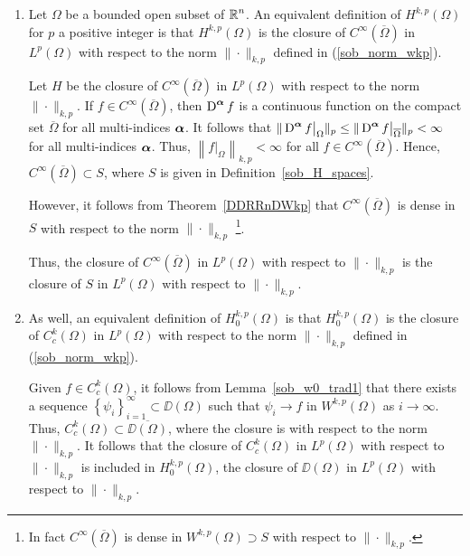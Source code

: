 \begin{rmkList} \label{sob_compl_Hk2}
\begin{enumerate}
\item Let $\Omega$ be a bounded open subset of $\displaystyle \mathbb{R}^n$.
An equivalent definition of $\displaystyle H^{k,p}(\Omega)$ for $p$ a
positive integer is that $\displaystyle H^{k,p}(\Omega)$ is the closure of
$\displaystyle C^\infty(\overline{\Omega})$ in $\displaystyle L^p(\Omega)$
with respect to the norm $\|\cdot\|_{k,p}$ defined in
(\ref{sob_norm_wkp}).

Let $H$ be the closure of $\displaystyle C^\infty(\overline{\Omega})$ in
$\displaystyle L^p(\Omega)$ with respect to the norm $\|\cdot\|_{k,p}$.
If $\displaystyle f\in C^\infty(\overline{\Omega})$, then
$\displaystyle \operatorname{D}^{{\bm{\alpha}}} f$ is a
continuous function on the compact set $\overline{\Omega}$ for all
multi-indices ${\bm{\alpha}}$.  It follows that
$\displaystyle \|\operatorname{D}^{{\bm{\alpha}}} f\big|_{\Omega}\|_p \leq
\|\operatorname{D}^{{\bm{\alpha}}} f\big|_{\overline{\Omega}}\|_p < \infty$ for all
multi-indices ${\bm{\alpha}}$.  Thus,
$\displaystyle \left\|f\big|_{\Omega} \right\|_{k,p} < \infty$ for all
$\displaystyle f\in C^\infty(\overline{\Omega})$.  Hence,
$\displaystyle C^\infty(\overline{\Omega}) \subset S$, where $S$ is given in
Definition~\ref{sob_H_spaces}.

However, it follows from Theorem~\ref{DDRRnDWkp} that
$\displaystyle C^\infty(\overline{\Omega})$ is dense in $S$ with
respect to the norm $\|\cdot\|_{k,p}$ \footnote{In fact
$\displaystyle C^\infty(\overline{\Omega})$
is dense in $\displaystyle W^{k,p}(\Omega) \supset S$ with respect to
$\|\cdot\|_{k,p}$.}.

Thus, the closure of $\displaystyle C^\infty(\overline{\Omega})$ in
$\displaystyle L^p(\Omega)$ with respect to $\|\cdot\|_{k,p}$
is the closure of $S$ in $\displaystyle L^p(\Omega)$
with respect to $\|\cdot\|_{k,p}$.

\item As well, an equivalent definition of
$\displaystyle H^{k,p}_0(\Omega)$ is that
$\displaystyle H^{k,p}_0(\Omega)$ is the
closure of $\displaystyle C^k_c(\Omega)$ in $\displaystyle L^p(\Omega)$
with respect to the norm $\|\cdot\|_{k,p}$ defined in
(\ref{sob_norm_wkp}).

Given $\displaystyle f \in C^k_c(\Omega)$, it follows from
Lemma~\ref{sob_w0_trad1} that there exists a sequence
$\displaystyle \left\{ \psi_i \right\}_{i=1}^\infty \subset \DD(\Omega)$
such that $\psi_i \to f$ in $\displaystyle W^{k,p}(\Omega)$ as $i \to \infty$.
Thus, $\displaystyle C^k_c(\Omega) \subset \overline{\DD(\Omega)}$,
where the closure is with respect to the norm $\|\cdot\|_{k,p}$.
It follows that the closure of $\displaystyle C^k_c(\Omega)$ in
$\displaystyle L^p(\Omega)$ with respect to $\|\cdot\|_{k,p}$
is included in $\displaystyle H^{k,p}_0(\Omega)$, the closure of
$\DD(\Omega)$ in $\displaystyle L^p(\Omega)$
with respect to $\|\cdot\|_{k,p}$.


\end{enumerate}
\end{rmkList}
